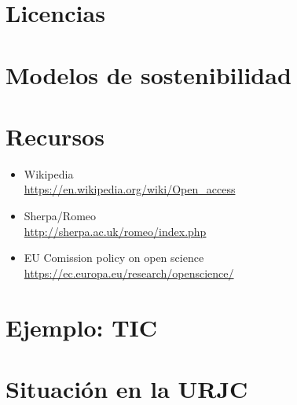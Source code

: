\documentclass[17pt,aspectratio=169]{beamer}
\begin{document}
\section{Licencias}

\section{Modelos de sostenibilidad}

\section{Recursos}

\begin{frame}

  \begin{itemize}
  \item Wikipedia \\
    {\small \url{https://en.wikipedia.org/wiki/Open_access}}
  \item Sherpa/Romeo \\
    {\small \url{http://sherpa.ac.uk/romeo/index.php}}
  \item EU Comission policy on open science \\
    {\small \url{https://ec.europa.eu/research/openscience/}}
  \end{itemize}

\end{frame}

\section{Ejemplo: TIC}


\section{Situación en la URJC}
\end{document}
